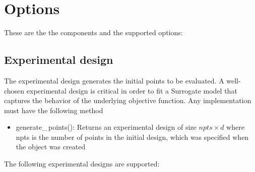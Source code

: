 \documentclass[]{article}
\begin{document}
\section{Options}
These are the the components and the supported options:
\subsection{Experimental design} 
\label{expdes}
The experimental design generates the initial points to be evaluated. A well-chosen experimental design is critical in order to fit a Surrogate model that captures the behavior of the underlying objective function. Any implementation must have the following method
\begin{itemize}
\item generate\_\,points(): Returns an experimental design of size $npts \times d$ where npts is the number of points in the initial design, which was specified when the object was created 
\end{itemize}
The following experimental designs are supported:
\end{document}
